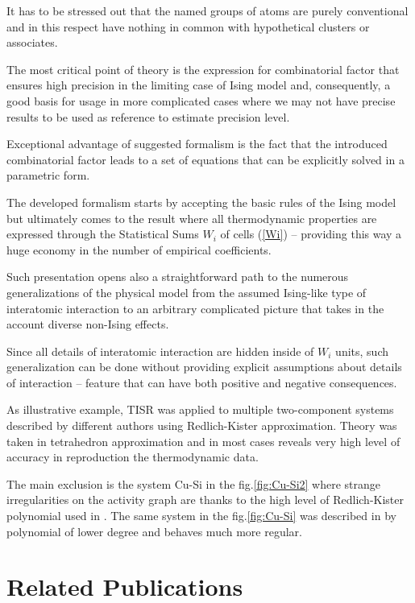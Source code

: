 \documentclass[12pt,abstract]{scrartcl}
\begin{document}
It has to be stressed out that the named groups of atoms are purely conventional and in this respect have nothing in common with hypothetical clusters or associates.

The most critical point of theory is the expression for combinatorial factor that ensures high precision in the limiting case of Ising model and, consequently, a good basis for usage in more complicated cases where we may not have precise results to be used as reference to estimate precision level. 


Exceptional advantage of suggested formalism is the fact that the introduced  combinatorial factor leads to a set of equations that can be explicitly solved in a parametric form.

The developed formalism starts by accepting  the basic rules of the Ising model but ultimately comes to  the result where all thermodynamic properties are expressed through the Statistical Sums $W_i$ of cells (\ref{Wi}) -- providing this way a huge economy in the number of empirical coefficients.

Such presentation opens also a straightforward path to the numerous generalizations of the physical model from the assumed Ising-like type of interatomic interaction to an arbitrary complicated picture that takes in the account  diverse non-Ising effects.

Since all details of interatomic interaction are hidden inside of  $W_i$ units, such generalization can be done without providing explicit assumptions about details of interaction -- feature that can have both positive and negative consequences.

As illustrative example, TISR was applied to multiple two-component systems described by different authors using Redlich-Kister approximation. Theory was taken in tetrahedron approximation and in most cases  reveals very high level of  accuracy in reproduction the thermodynamic data.

The main exclusion is the system Cu-Si in the fig.\ref{fig:Cu-Si2} where strange irregularities on the activity graph are thanks to the high level of Redlich-Kister polynomial used in \cite{Cu-Si2_Data}. The same system in the fig.\ref{fig:Cu-Si} was described in
 \cite{Al-Si_Data} by polynomial of lower degree and behaves much more regular.

\section{Related Publications}
\end{document}
